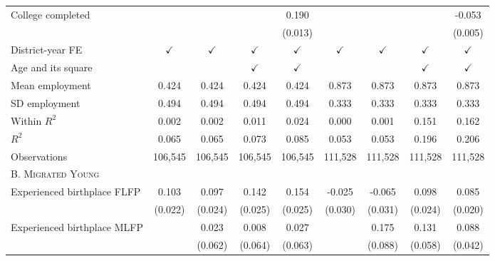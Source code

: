 \begin{center}
\begin{adjustbox}{max width=1\textwidth}
\begin{threeparttable}[!h]
\begin{tabular}{lcccccccc}
College completed   &                     &                     &                     &       0.190\sym{***}&                     &                     &                     &      -0.053\sym{***}\\
                    &                     &                     &                     &     (0.013)         &                     &                     &                     &     (0.005)         \\
\midrule District-year FE&$ \checkmark $&$ \checkmark $&$ \checkmark $&$ \checkmark $&$ \checkmark $&$ \checkmark $&$ \checkmark $&$ \checkmark $\\
Age and its square  &            &            &$ \checkmark $&$ \checkmark $&            &            &$ \checkmark $&$ \checkmark $\\
\midrule Mean employment&       0.424&       0.424&       0.424&       0.424&       0.873&       0.873&       0.873&       0.873\\
SD employment       &       0.494&       0.494&       0.494&       0.494&       0.333&       0.333&       0.333&       0.333\\
Within $ R^2 $      &       0.002&       0.002&       0.011&       0.024&       0.000&       0.001&       0.151&       0.162\\
$ R^2 $             &       0.065&       0.065&       0.073&       0.085&       0.053&       0.053&       0.196&       0.206\\
\midrule Observations&     106,545&     106,545&     106,545&     106,545&     111,528&     111,528&     111,528&     111,528\\
\midrule \scshape B. Migrated Young\\
\midrule  Experienced birthplace FLFP&       0.103\sym{***}&       0.097\sym{***}&       0.142\sym{***}&       0.154\sym{***}&      -0.025         &      -0.065\sym{*}  &       0.098\sym{***}&       0.085\sym{***}\\
                    &     (0.022)         &     (0.024)         &     (0.025)         &     (0.025)         &     (0.030)         &     (0.031)         &     (0.024)         &     (0.020)         \\
 Experienced birthplace MLFP&                     &       0.023         &       0.008         &       0.027         &                     &       0.175\sym{*}  &       0.131\sym{*}  &       0.088\sym{*}  \\
                    &                     &     (0.062)         &     (0.064)         &     (0.063)         &                     &     (0.088)         &     (0.058)         &     (0.042)         \\

\end{tabular}
\end{threeparttable}
\end{adjustbox}
\end{center}

